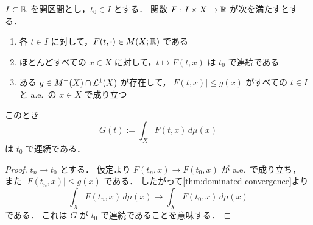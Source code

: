\begin{theorem}[積分記号下の連続性]\label{thm:continuity-under-integral-sign}
$I\subset\mathbb R$ を開区間とし，$t_0\in I$ とする．
関数 $F:I\times X\to\mathbb R$ が次を満たすとする．
\begin{enumerate}
    \item 各 $t\in I$ に対して，$F(t,\cdot)\in M(X;\mathbb R)$ である
    \item ほとんどすべての $x\in X$ に対して，$t\mapsto F(t,x)$ は $t_0$ で連続である
    \item ある $g\in M^+(X)\cap\mathcal L^1(X)$ が存在して，$|F(t,x)|\le g(x)$ がすべての $t\in I$ と a.e.\ の $x\in X$ で成り立つ
\end{enumerate}
このとき
\[
G(t):=\int_X F(t,x)\,d\mu(x)
\]
は $t_0$ で連続である．
\end{theorem}
\begin{proof}
$t_n\to t_0$ とする．
仮定より $F(t_n,x)\to F(t_0,x)$ が a.e.\ で成り立ち，
また $|F(t_n,x)|\le g(x)$ である．
したがって\cref{thm:dominated-convergence}より
\[
\int_X F(t_n,x)\,d\mu(x)\to \int_X F(t_0,x)\,d\mu(x)
\]
である．
これは $G$ が $t_0$ で連続であることを意味する．
\end{proof}

